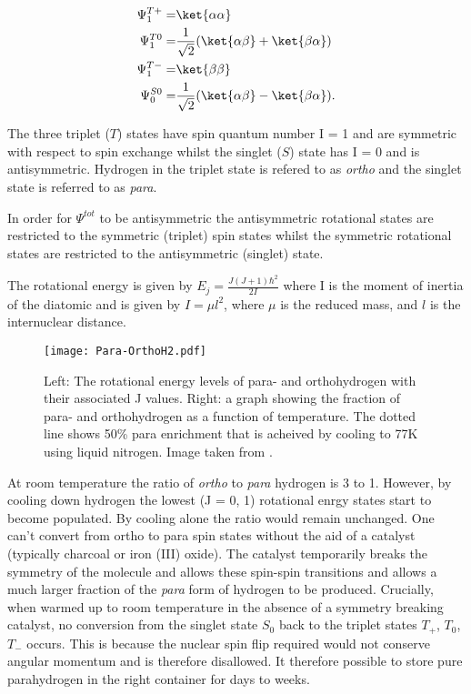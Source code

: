  \begin{align}
 \Psi_{1}^{T+} =& \ket{\alpha\alpha}\\
 \Psi_{1}^{T0} =& \frac{1}{\sqrt{2}} (\ket{\alpha\beta}+\ket{\beta\alpha})\\
 \Psi_{1}^{T-} =& \ket{\beta\beta}\\
 \Psi_{0}^{S0} =& \frac{1}{\sqrt{2}} (\ket{\alpha\beta}-\ket{\beta\alpha}).
 \end{align}

 The three triplet ($T$) states have spin quantum number I = 1 and are symmetric with respect to spin exchange whilst
 the singlet ($S$) state has I = 0 and is antisymmetric. Hydrogen in the triplet state is refered to as \textit{ortho} and the
 singlet state is referred to as \textit{para}.

 In order for $\Psi^{tot}$ to be antisymmetric the antisymmetric rotational states are restricted to the symmetric (triplet) spin states whilst the symmetric rotational states are restricted to the antisymmetric (singlet) state.

 The rotational energy is given by $E_j = \frac{J(J+1)\hbar^2}{2I}$
 where I is the moment of inertia of the diatomic and is given by $I = \mu l^2$, where $\mu$ is the reduced mass,
 and $l$ is the internuclear distance.

 \begin{figure*}
   \begin{center}
   \texttt{[image: Para-OrthoH2.pdf]}
   \end{center}
   \caption{Left: The rotational energy levels of para- and orthohydrogen with their associated J values. Right: a graph
   showing the fraction of para- and orthohydrogen as a function of temperature. The dotted line shows 50\% para
   enrichment that is acheived by cooling to 77K using liquid nitrogen. Image taken from \citep{barskiy2017nmr}.}
   \label{fig:POH2}
 \end{figure*}


 At room temperature the ratio of \textit{ortho} to \textit{para} hydrogen is 3 to 1. However, by cooling down hydrogen the lowest (J = 0, 1) rotational enrgy states start to become populated. By cooling alone the ratio would remain unchanged. One can't convert from ortho to para spin states without the aid of a catalyst (typically charcoal or iron (III) oxide). The catalyst temporarily breaks the symmetry of the  molecule and allows these spin-spin transitions and allows a much larger fraction of the \textit{para} form of hydrogen to be produced. Crucially, when warmed up to
 room temperature in the absence of a symmetry breaking catalyst, no conversion from the singlet state $S_0$ back to
 the triplet states $T_+$, $T_0$, $T_-$ occurs. This is because the nuclear spin flip required would not
 conserve angular momentum and is therefore disallowed. It therefore possible to store pure parahydrogen
 in the right container for days to weeks.

